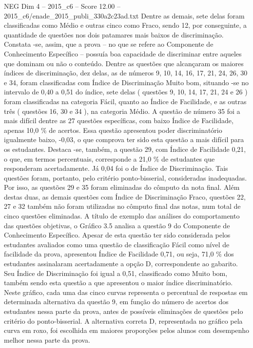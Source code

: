 \begin{textsample}{NEG Dim 4 – 2015\_c6 – Score 12.00 – 2015\_c6/enade\_2015\_publi\_330a2c23ad.txt}
Dentre as demais, sete delas foram classificadas como Médio e outras cinco como Fraco, sendo 12, por conseguinte, a quantidade de questões nos dois patamares mais baixos de discriminação.
Constata -se, assim, que a prova – no que se refere ao Componente de Conhecimento Específico – possuía boa capacidade de discriminar entre aqueles que dominam ou não o conteúdo.
Dentre as questões que alcançaram os maiores índices de discriminação, dez delas, as de números 9, 10, 14, 16, 17, 21, 24, 26, 30 e 34, foram classificadas com Índice de Discriminação Muito bom, situando -se no intervalo de 0,40 a 0,51 do índice, sete delas ( questões 9, 10, 14, 17, 21, 24 e 26 ) foram classificadas na categoria Fácil, quanto ao Índice de Facilidade, e as outras três ( questões 16, 30 e 34 ), na categoria Médio.
A questão de número 35 foi a mais difícil dentre as 27 questões específicas, com baixo Índice de Facilidade, apenas 10,0 \% de acertos.
Essa questão apresentou poder discriminatório igualmente baixo, -0,03, o que comprova ter sido esta questão a mais difícil para os estudantes.
Destaca -se, também, a questão 29, com Índice de Facilidade 0,21, o que, em termos percentuais, corresponde a 21,0 \% de estudantes que responderam acertadamente.
Já 0,04 foi o de Índice de Discriminação.
Tais questões foram, portanto, pelo critério ponto-bisserial, consideradas inadequadas.
Por isso, as questões 29 e 35 foram eliminadas do cômputo da nota final.
Além destas duas, as demais questões com Índice de Discriminação Fraco, questões 22, 27 e 32 também não foram utilizadas no cômputo final das notas, num total de cinco questões eliminadas.
A título de exemplo das análises do comportamento das questões objetivas, o Gráfico 3.5 analisa a questão 9 do Componente de Conhecimento Específico.
Apesar de esta questão ter sido considerada pelos estudantes avaliados como uma questão de classificação Fácil como nível de facilidade da prova, apresentou Índice de Facilidade 0,71, ou seja, 71,0 \% dos estudantes assinalaram acertadamente a opção D, correspondente ao gabarito.
Seu Índice de Discriminação foi igual a 0,51, classificado como Muito bom, também sendo esta questão a que apresentou o maior índice discriminatório.
Neste gráfico, cada uma das cinco curvas representa o percentual de respostas em determinada alternativa da questão 9, em função do número de acertos dos estudantes nessa parte da prova, antes de possíveis eliminações de questões pelo critério do ponto-bisserial.
A alternativa correta D, representada no gráfico pela curva em roxo, foi escolhida em maiores proporções pelos alunos com desempenho melhor nessa parte da prova.

\end{textsample}
